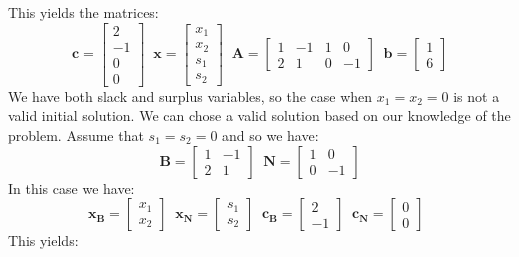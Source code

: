 \begin{example}
This yields the matrices:
\begin{displaymath}
\mathbf{c} = \begin{bmatrix}2 \\ -1 \\ 0 \\ 0\end{bmatrix}\;\;
\mathbf{x} = \begin{bmatrix}x_1 \\ x_2 \\ s_1 \\ s_2\end{bmatrix}\;\;
\mathbf{A} = \begin{bmatrix} 
1 & -1 & 1 & 0\\
2 & 1 & 0 & -1
\end{bmatrix}\;\;
\mathbf{b} = \begin{bmatrix}1 \\ 6\end{bmatrix}
\end{displaymath}
We have both slack and surplus variables, so the case when $x_1 = x_2 = 0$ is not a valid initial solution. We can chose a valid solution based on our knowledge of the problem. Assume that $s_1 = s_2 = 0$ and so we have:
\begin{displaymath}
\mathbf{B} = \begin{bmatrix}
1 & -1\\
2 & 1
\end{bmatrix}\;\;
\mathbf{N} = \begin{bmatrix}
1 & 0\\
0 & -1
\end{bmatrix}
\end{displaymath}
In this case we have:
\begin{displaymath}
\mathbf{x_B} = \begin{bmatrix}x_1 \\ x_2\end{bmatrix}\;\;
\mathbf{x_N} = \begin{bmatrix}s_1 \\ s_2\end{bmatrix}\;\;
\mathbf{c_B} = \begin{bmatrix}2 \\ -1\end{bmatrix}\;\;
\mathbf{c_N} = \begin{bmatrix}0 \\ 0\end{bmatrix}\;\;
\end{displaymath}
This yields:

\end{example}

